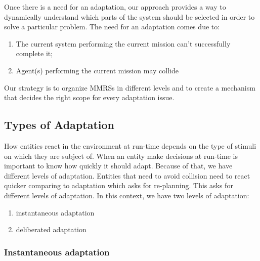 \documentclass[journal]{IEEEtran}
\theoremstyle{definition}
\begin{document}



Once there is a need for an adaptation, our approach provides a way to dynamically understand which parts of the
system should be selected in order to solve a particular problem. The need for an adaptation comes due to:
\begin{enumerate}
\item The current system performing the current mission can't successfully complete it;
\item Agent(s) performing the current mission may collide
\end{enumerate}

Our strategy is to organize MMRSs in different levels and to create a mechanism that decides the right scope for every adaptation issue.

\subsection{Types of Adaptation}
How entities react in the environment at run-time depends on the type of stimuli on which they are subject of. When an entity make decisions at run-time is important to know how quickly it should adapt. Because of that, we have different levels of adaptation. Entities that need to avoid collision need to react quicker comparing to adaptation which asks for re-planning.
This asks for different levels of adaptation. In this context, we have two levels of adaptation:
\begin{enumerate}
\item instantaneous adaptation
\item deliberated adaptation
\end{enumerate}






\subsubsection{Instantaneous adaptation}
\end{document}
